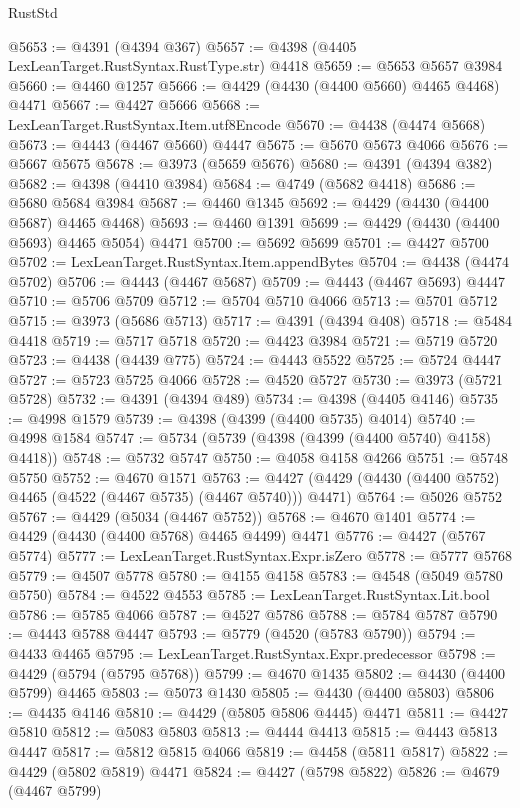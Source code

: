 \begin{lexlean}{RustStd}
\begin{coremodule}
@5653 := @4391 (@4394 @367)
@5657 := @4398 (@4405 LexLeanTarget.RustSyntax.RustType.str) @4418
@5659 := @5653 @5657 @3984
@5660 := @4460 @1257
@5666 := @4429 (@4430 (@4400 @5660) @4465 @4468) @4471
@5667 := @4427 @5666
@5668 := LexLeanTarget.RustSyntax.Item.utf8Encode
@5670 := @4438 (@4474 @5668)
@5673 := @4443 (@4467 @5660) @4447
@5675 := @5670 @5673 @4066
@5676 := @5667 @5675
@5678 := @3973 (@5659 @5676)
@5680 := @4391 (@4394 @382)
@5682 := @4398 (@4410 @3984)
@5684 := @4749 (@5682 @4418)
@5686 := @5680 @5684 @3984
@5687 := @4460 @1345
@5692 := @4429 (@4430 (@4400 @5687) @4465 @4468)
@5693 := @4460 @1391
@5699 := @4429 (@4430 (@4400 @5693) @4465 @5054) @4471
@5700 := @5692 @5699
@5701 := @4427 @5700
@5702 := LexLeanTarget.RustSyntax.Item.appendBytes
@5704 := @4438 (@4474 @5702)
@5706 := @4443 (@4467 @5687)
@5709 := @4443 (@4467 @5693) @4447
@5710 := @5706 @5709
@5712 := @5704 @5710 @4066
@5713 := @5701 @5712
@5715 := @3973 (@5686 @5713)
@5717 := @4391 (@4394 @408)
@5718 := @5484 @4418
@5719 := @5717 @5718
@5720 := @4423 @3984
@5721 := @5719 @5720
@5723 := @4438 (@4439 @775)
@5724 := @4443 @5522
@5725 := @5724 @4447
@5727 := @5723 @5725 @4066
@5728 := @4520 @5727
@5730 := @3973 (@5721 @5728)
@5732 := @4391 (@4394 @489)
@5734 := @4398 (@4405 @4146)
@5735 := @4998 @1579
@5739 := @4398 (@4399 (@4400 @5735) @4014)
@5740 := @4998 @1584
@5747 := @5734 (@5739 (@4398 (@4399 (@4400 @5740) @4158) @4418))
@5748 := @5732 @5747
@5750 := @4058 @4158 @4266
@5751 := @5748 @5750
@5752 := @4670 @1571
@5763 := @4427 (@4429 (@4430 (@4400 @5752) @4465 (@4522 (@4467 @5735) (@4467 @5740))) @4471)
@5764 := @5026 @5752
@5767 := @4429 (@5034 (@4467 @5752))
@5768 := @4670 @1401
@5774 := @4429 (@4430 (@4400 @5768) @4465 @4499) @4471
@5776 := @4427 (@5767 @5774)
@5777 := LexLeanTarget.RustSyntax.Expr.isZero
@5778 := @5777 @5768
@5779 := @4507 @5778
@5780 := @4155 @4158
@5783 := @4548 (@5049 @5780 @5750)
@5784 := @4522 @4553
@5785 := LexLeanTarget.RustSyntax.Lit.bool
@5786 := @5785 @4066
@5787 := @4527 @5786
@5788 := @5784 @5787
@5790 := @4443 @5788 @4447
@5793 := @5779 (@4520 (@5783 @5790))
@5794 := @4433 @4465
@5795 := LexLeanTarget.RustSyntax.Expr.predecessor
@5798 := @4429 (@5794 (@5795 @5768))
@5799 := @4670 @1435
@5802 := @4430 (@4400 @5799) @4465
@5803 := @5073 @1430
@5805 := @4430 (@4400 @5803)
@5806 := @4435 @4146
@5810 := @4429 (@5805 @5806 @4445) @4471
@5811 := @4427 @5810
@5812 := @5083 @5803
@5813 := @4444 @4413
@5815 := @4443 @5813 @4447
@5817 := @5812 @5815 @4066
@5819 := @4458 (@5811 @5817)
@5822 := @4429 (@5802 @5819) @4471
@5824 := @4427 (@5798 @5822)
@5826 := @4679 (@4467 @5799)

\end{coremodule}
\end{lexlean}
